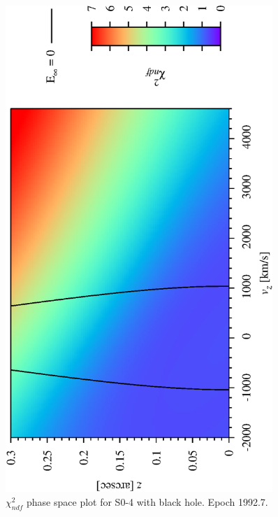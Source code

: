 \begin{figure}[!pt]
	\begin{center}
	\includegraphics[angle=-90,width=0.9\textwidth]{eps/so4-BH-run2.eps}
	\caption{$\chi^2_{ndf}$ phase space plot for S0-4 with black hole. Epoch 1992.7.}
	\label{fig_so4BHphasespace}
	\end{center}
\end{figure}
